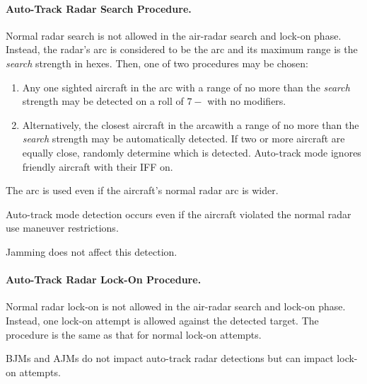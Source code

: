 \begin{advancedrules}
{\paragraph{Auto-Track Radar Search Procedure.} Normal radar search is not allowed in the air-radar search and lock-on phase. Instead, the radar's arc is considered to be the \emph{} arc and its maximum range is the \emph{search} strength in hexes. Then, one of two procedures may be chosen:
\begin{enumerate}
\item Any one sighted aircraft in the \emph{} arc with a range of no more than the \emph{search} strength may be detected on a roll of $7-$ with no modifiers.
\item Alternatively, the closest aircraft in the \emph{} arcawith a range of no more than the \emph{search} strength may be automatically detected. If two or more aircraft are equally close, randomly determine which is detected. Auto-track mode ignores friendly aircraft with their IFF on.
\end{enumerate}

The  arc is used even if the aircraft's normal radar arc is wider.

Auto-track mode detection occurs even if the aircraft violated the normal radar use maneuver restrictions.

Jamming does not affect this detection. 


\paragraph{Auto-Track Radar Lock-On Procedure.}

Normal radar lock-on is not allowed in the air-radar search and lock-on phase.
Instead, one lock-on attempt is allowed against the detected target. The procedure is the same as that for normal lock-on attempts.


BJMs and AJMs do not impact auto-track radar detections but can impact lock-on attempts.

}

\end{advancedrules}
